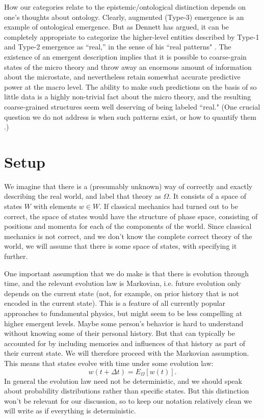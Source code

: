 \documentclass[12pt,english]{article}
\newcommand{\be}{\begin{equation}}
\newcommand{\ee}{\end{equation}}
\newcommand{\autocite}{\cite}
\begin{document}
How our categories relate to the epistemic/ontological distinction depends on one's thoughts about ontology.
Clearly, augmented (Type-3) emergence is an example of ontological emergence.
But as Dennett has argued, it can be completely appropriate to categorize the higher-level entities described by Type-1 and Type-2 emergence as ``real,'' in the sense of his ``real patterns" \autocite{Dennett1991-DENRP}.
The existence of an emergent description implies that it is possible to coarse-grain states of the micro theory and throw away an enormous amount of information about the microstate, and nevertheless retain somewhat accurate predictive power at the macro level.
The ability to make such predictions on the basis of so little data is a highly non-trivial fact about the micro theory, and the resulting coarse-grained structures seem well deserving of being labeled ``real."
(One crucial question we do not address is when such patterns exist, or how to quantify them \autocite{CRUTCHFIELD199411,shalizi2003macrostate,krakauer2020information,PhysRevE.108.014304,rupe2024principles}.)

\section*{Setup}

We imagine that there is a (presumably unknown) way of correctly and exactly describing the real world, and label that theory as $\Omega$.
It consists of a space of states $W$  with elements  $w \in W$.
If classical mechanics had turned out to be correct, the space of states would have the structure of phase space, consisting of positions and momenta for each of the components of the world.
Since classical mechanics is not correct, and we don't know the complete correct theory of the world, we will assume that there is some space of states, with specifying it further.

One important assumption that we do make is that there is evolution through time, and the relevant evolution law is Markovian, i.e. future evolution only depends on the current state (not, for example, on prior history that is not encoded in the current state).
This is a feature of all currently popular approaches to fundamental physics, but might seem to be less compelling at higher emergent levels.
Maybe some person's behavior is hard to understand without knowing some of their personal history.
But that can typically be accounted for by including memories and influences of that history as part of their current state.
We will therefore proceed with the Markovian assumption.
This means that states evolve with time under some evolution law:
\be
  w(t+\Delta t) = E_\Omega[w(t)]. 
\ee
In general the evolution law need not be deterministic, and we should speak about probability distributions rather than specific states. 
But this distinction won’t be relevant for our discussion, so to keep our notation relatively clean we will write as if everything is deterministic.
\end{document}

